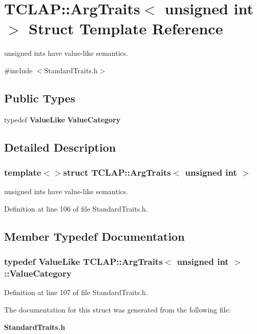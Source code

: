 \section{T\+C\+L\+A\+P\+:\+:Arg\+Traits$<$ unsigned int $>$ Struct Template Reference}
\label{structTCLAP_1_1ArgTraits_3_01unsigned_01int_01_4}


unsigned ints have value-\/like semantics.  




{\ttfamily \#include $<$Standard\+Traits.\+h$>$}

\subsection*{Public Types}
\begin{DoxyCompactItemize}
\item 
typedef {\bf Value\+Like} {\bf Value\+Category}
\end{DoxyCompactItemize}


\subsection{Detailed Description}
\subsubsection*{template$<$$>$struct T\+C\+L\+A\+P\+::\+Arg\+Traits$<$ unsigned int $>$}

unsigned ints have value-\/like semantics. 

Definition at line 106 of file Standard\+Traits.\+h.



\subsection{Member Typedef Documentation}
\subsubsection[{Value\+Category}]{\setlength{\rightskip}{0pt plus 5cm}typedef {\bf Value\+Like} {\bf T\+C\+L\+A\+P\+::\+Arg\+Traits}$<$ unsigned int $>$\+::{\bf Value\+Category}}\label{structTCLAP_1_1ArgTraits_3_01unsigned_01int_01_4_ae95cdc132665581c458fc64c7e7a0490}


Definition at line 107 of file Standard\+Traits.\+h.



The documentation for this struct was generated from the following file\+:\begin{DoxyCompactItemize}
\item 
{\bf Standard\+Traits.\+h}\end{DoxyCompactItemize}
